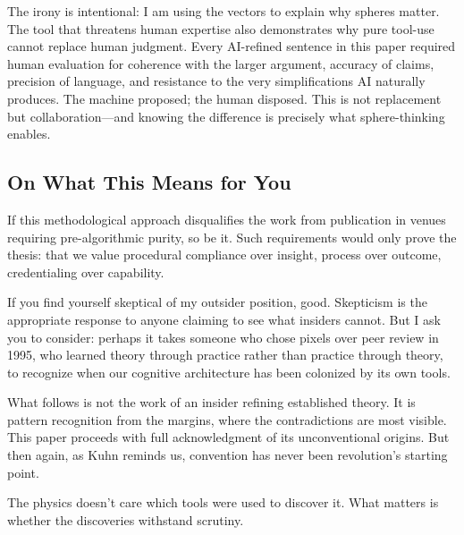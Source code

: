 The irony is intentional: I am using the vectors to explain why spheres matter. The tool that threatens human expertise also demonstrates why pure tool-use cannot replace human judgment. Every AI-refined sentence in this paper required human evaluation for coherence with the larger argument, accuracy of claims, precision of language, and resistance to the very simplifications AI naturally produces. The machine proposed; the human disposed. This is not replacement but collaboration—and knowing the difference is precisely what sphere-thinking enables.

\subsection*{On What This Means for You}

If this methodological approach disqualifies the work from publication in venues requiring pre-algorithmic purity, so be it. Such requirements would only prove the thesis: that we value procedural compliance over insight, process over outcome, credentialing over capability.

If you find yourself skeptical of my outsider position, good. Skepticism is the appropriate response to anyone claiming to see what insiders cannot. But I ask you to consider: perhaps it takes someone who chose pixels over peer review in 1995, who learned theory through practice rather than practice through theory, to recognize when our cognitive architecture has been colonized by its own tools.

What follows is not the work of an insider refining established theory. It is pattern recognition from the margins, where the contradictions are most visible. This paper proceeds with full acknowledgment of its unconventional origins. But then again, as Kuhn reminds us, convention has never been revolution's starting point.

The physics doesn't care which tools were used to discover it. What matters is whether the discoveries withstand scrutiny.
